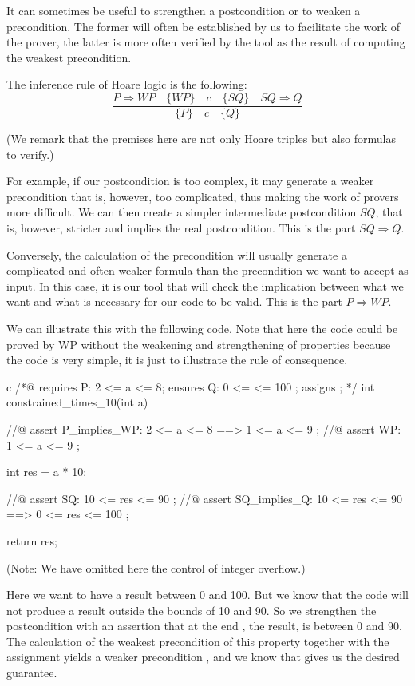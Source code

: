 It can sometimes be useful to strengthen a postcondition or to weaken a
precondition. The former will often be established by us to
facilitate the work of the prover, the latter is more often verified by
the tool as the result of computing the weakest precondition.



The inference rule of Hoare logic is the following:
$$\dfrac{P \Rightarrow WP \quad \{WP\}\quad c\quad \{SQ\} \quad SQ \Rightarrow Q}{\{P\}\quad c \quad \{Q\}}$$

(We remark that the premises here are not only Hoare triples but also
formulas to verify.)

For example, if our postcondition is too complex, it may generate a
weaker precondition that is, however, too complicated, thus making the
work of provers more difficult. We can then create a simpler
intermediate postcondition $SQ$, that is, however, stricter and
implies the real postcondition. This is the part $SQ \Rightarrow Q$.

Conversely, the calculation of the precondition will usually generate a
complicated and often weaker formula than the precondition we want to
accept as input. In this case, it is our tool that will check the
implication between what we want and what is necessary for our code to
be valid. This is the part $P \Rightarrow WP$.

We can illustrate this with the following code. Note that here the code
could be proved by WP without the weakening and strengthening of
properties because the code is very simple, it is just to illustrate the
rule of consequence.



\begin{CodeBlock}{c}
/*@
  requires P: 2 <= a <= 8;
  ensures  Q: 0 <= \result <= 100 ;
  assigns  \nothing ;
*/
int constrained_times_10(int a){
  //@ assert P_implies_WP: 2 <= a <= 8 ==> 1 <= a <= 9 ;
  //@ assert WP:           1 <= a <= 9 ;

  int res = a * 10;

  //@ assert SQ:           10 <= res <= 90 ;
  //@ assert SQ_implies_Q: 10 <= res <= 90 ==> 0 <= res <= 100 ;

  return res;
}
\end{CodeBlock}



(Note: We have omitted here the control of integer overflow.)



Here we want to have a result between 0 and 100. But we know that the
code will not produce a result outside the bounds of 10 and 90. So we
strengthen the postcondition with an assertion that at the end
, the result, is between 0 and 90. The calculation of the
weakest precondition of this property together with the assignment
 yields a weaker precondition
, and we know that
 gives us the desired
guarantee.



